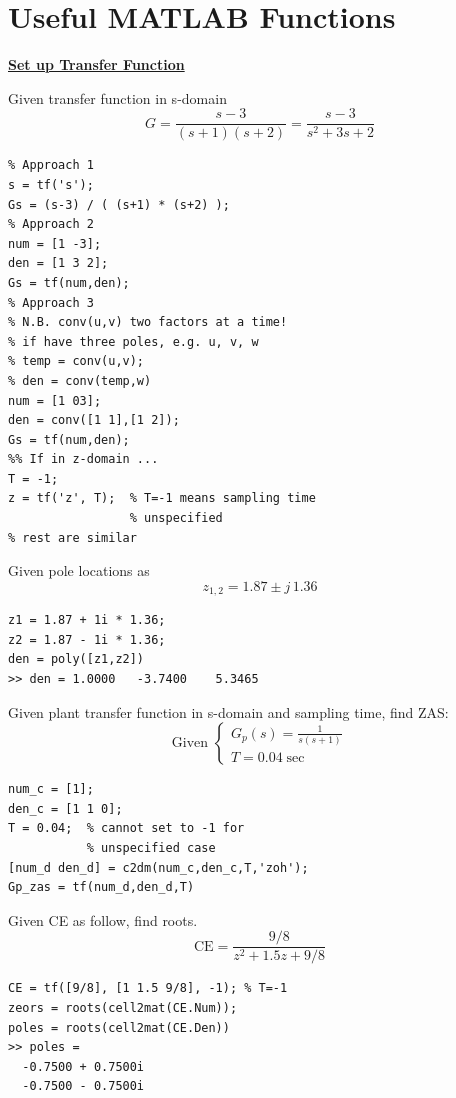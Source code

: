 \clearpage
\section{Useful MATLAB Functions}

\underline{\textbf{Set up Transfer Function}}

Given transfer function in s-domain
    \begin{equation*}
        G = \frac{s-3}{(s+1)(s+2)} = \frac{s-3}{s^2+3s+2}
    \end{equation*}

\begin{lstlisting}
% Approach 1
s = tf('s');
Gs = (s-3) / ( (s+1) * (s+2) );
% Approach 2
num = [1 -3];
den = [1 3 2];
Gs = tf(num,den);
% Approach 3
% N.B. conv(u,v) two factors at a time!
% if have three poles, e.g. u, v, w
% temp = conv(u,v);
% den = conv(temp,w)
num = [1 03];
den = conv([1 1],[1 2]);
Gs = tf(num,den);
%% If in z-domain ...
T = -1;
z = tf('z', T);  % T=-1 means sampling time
                 % unspecified
% rest are similar
\end{lstlisting}

Given pole locations as
\begin{equation*}
    z_{1,2} = 1.87 \pm j\, 1.36
\end{equation*}

\begin{lstlisting}
z1 = 1.87 + 1i * 1.36; 
z2 = 1.87 - 1i * 1.36;
den = poly([z1,z2])
>> den = 1.0000   -3.7400    5.3465
\end{lstlisting}

Given plant transfer function in s-domain and sampling time, find ZAS:
\begin{equation*}
    \text{Given } \begin{cases}
    G_p(s) = \frac{1}{s(s+1)} \\
    T = 0.04 \; \text{sec}
    \end{cases}
\end{equation*}
\begin{lstlisting}
num_c = [1];
den_c = [1 1 0];
T = 0.04;  % cannot set to -1 for 
           % unspecified case
[num_d den_d] = c2dm(num_c,den_c,T,'zoh');
Gp_zas = tf(num_d,den_d,T)
\end{lstlisting}

Given CE as follow, find roots.
\begin{equation*}
    \text{CE} = \frac{9/8}{z^2+1.5z+9/8}
\end{equation*}
\begin{lstlisting}
CE = tf([9/8], [1 1.5 9/8], -1); % T=-1
zeors = roots(cell2mat(CE.Num));
poles = roots(cell2mat(CE.Den))
>> poles =
  -0.7500 + 0.7500i
  -0.7500 - 0.7500i
\end{lstlisting}

